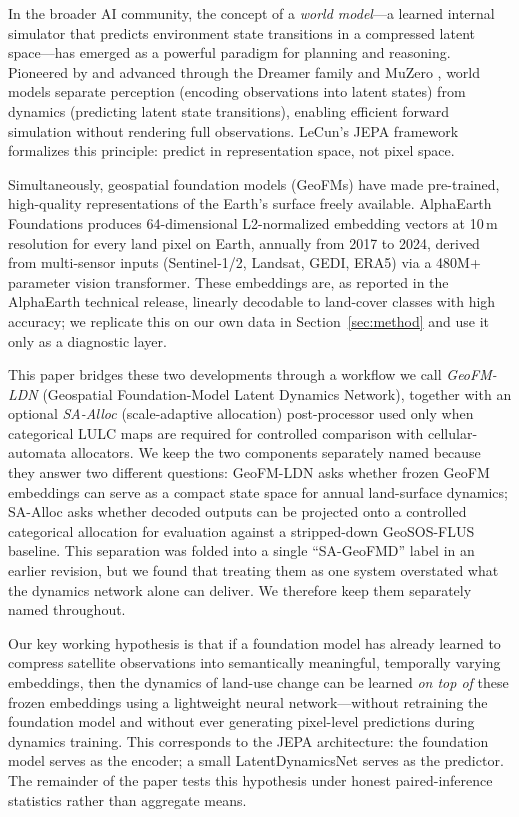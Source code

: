 \documentclass{article}
\begin{document}
In the broader AI community, the concept of a \textit{world model}---a learned internal simulator that predicts environment state transitions in a compressed latent space---has emerged as a powerful paradigm for planning and reasoning. Pioneered by \citet{ha2018world} and advanced through the Dreamer family \citep{hafner2023dreamerv3} and MuZero \citep{schrittwieser2020muzero}, world models separate perception (encoding observations into latent states) from dynamics (predicting latent state transitions), enabling efficient forward simulation without rendering full observations. LeCun's JEPA framework \citep{lecun2022jepa} formalizes this principle: predict in representation space, not pixel space.

Simultaneously, geospatial foundation models (GeoFMs) have made pre-trained, high-quality representations of the Earth's surface freely available. AlphaEarth Foundations \citep{brown2025alphaearth} produces 64-dimensional L2-normalized embedding vectors at 10\,m resolution for every land pixel on Earth, annually from 2017 to 2024, derived from multi-sensor inputs (Sentinel-1/2, Landsat, GEDI, ERA5) via a 480M+ parameter vision transformer. These embeddings are, as reported in the AlphaEarth technical release, linearly decodable to land-cover classes with high accuracy; we replicate this on our own data in Section~\ref{sec:method} and use it only as a diagnostic layer.

This paper bridges these two developments through a workflow we call \textit{GeoFM-LDN} (Geospatial Foundation-Model Latent Dynamics Network), together with an optional \textit{SA-Alloc} (scale-adaptive allocation) post-processor used only when categorical LULC maps are required for controlled comparison with cellular-automata allocators. We keep the two components separately named because they answer two different questions: GeoFM-LDN asks whether frozen GeoFM embeddings can serve as a compact state space for annual land-surface dynamics; SA-Alloc asks whether decoded outputs can be projected onto a controlled categorical allocation for evaluation against a stripped-down GeoSOS-FLUS baseline. This separation was folded into a single ``SA-GeoFMD'' label in an earlier revision, but we found that treating them as one system overstated what the dynamics network alone can deliver. We therefore keep them separately named throughout.

Our key working hypothesis is that if a foundation model has already learned to compress satellite observations into semantically meaningful, temporally varying embeddings, then the dynamics of land-use change can be learned \textit{on top of} these frozen embeddings using a lightweight neural network---without retraining the foundation model and without ever generating pixel-level predictions during dynamics training. This corresponds to the JEPA architecture: the foundation model serves as the encoder; a small LatentDynamicsNet serves as the predictor. The remainder of the paper tests this hypothesis under honest paired-inference statistics rather than aggregate means.
\end{document}
